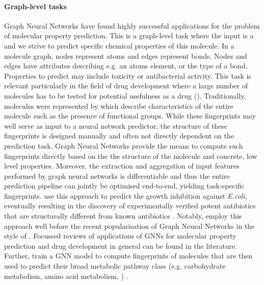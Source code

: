 \documentclass[
	fontsize=10pt, %
	twoside=false, %
	secnumdepth=1, %
  toc=indentunnumbered %
]{kaobook}
\begin{document}
\paragraph{Graph-level tasks} Graph Neural Networks have found highly successful
applications for the problem of molecular property prediction. This is a
graph-level task where the input is a  and we strive to
predict specific chemical properties of this molecule. In a molecule graph,
nodes represent atoms and edges represent bonds. Nodes and edges have attributes
describing e.g. an atoms element, or the type of a bond. Properties to predict
may include toxicity or antibacterial activity. This task is relevant
particularly in the field of drug development where a large number of molecules
has to be tested for potential usefulness as a drug ().
%
Traditionally, molecules were represented by  which
describe characteristics of the entire molecule such as the presence of
functional groups. While these fingerprints may well serve as input to a neural
network predictor, the structure of these fingerprints is designed manually and
often not directly dependent on the prediction task.
Graph Neural Networks provide the means to compute such fingerprints directly
based on the the structure of the molecule and concrete, low level properties.
Moreover, the extraction and aggregation of input features performed by graph
neural networks is differentiable and thus the entire prediction pipeline can
jointly be optimised end-to-end, yielding task-specific fingerprints.
\citeauthor{stokes_DeepLearningApproach_2020} use this approach to predict the
growth inhibition against \textit{E.coli}, eventually resulting in the discovery
of experimentally verified potent antibiotics that are structurally different
from known antibiotics \cite{stokes_DeepLearningApproach_2020}.
%
Notably, \citeauthor{duvenaud_convolutional_2015} employ this approach well
before the recent popularisation of Graph Neural Networks in the style of  
.
Focussed reviews of applications of GNNs for molecular property prediction
\cite{wieder_CompactReviewMolecular_2020}
and drug development in general
\cite{gaudelet_utilising_2020}
can be found in the literature.
%
Further, \citeauthor{baranwal_deep_2020} train a GNN model to compute
fingerprints of molecules that are then used to predict their broad metabolic
pathway class (e.g. carbohydrate metabolism, amino acid metabolism, \etc)
\cite{baranwal_deep_2020}.
\end{document}
